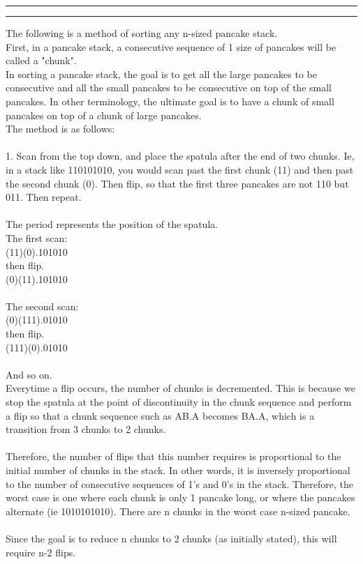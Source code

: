 \documentclass[11pt]{article}
\newcounter{questionCounter}
\newcounter{partCounter}[questionCounter]
\newenvironment{question}[2][\arabic{questionCounter}]{%
    \setcounter{partCounter}{0}%
    \vspace{.25in} \hrule \vspace{0.5em}%
        \noindent{\bf #2}%
    \vspace{0.8em} \hrule \vspace{.10in}%
    \addtocounter{questionCounter}{1}%
}{}
\begin{document}
\begin{question}{Post Puzzle Pancake Party}
The following is a method of sorting any n-sized pancake stack.\\
First, in a pancake stack, a consecutive sequence of 1 size of pancakes will be called a "chunk".\\
In sorting a pancake stack, the goal is to get all the large pancakes to be consecutive and all the small pancakes to be consecutive on top of the small pancakes. In other terminology, the ultimate goal is to have a chunk of small pancakes on top of a chunk of large pancakes.\\
The method is as follows:\\
\\
1. Scan from the top down, and place the spatula after the end of two chunks. Ie, in a stack like 110101010, you would scan past the first chunk (11) and then past the second chunk (0). Then flip, so that the first three pancakes are not 110 but 011. Then repeat.\\
\\
The period represents the position of the spatula. \\
The first scan:\\
(11)(0).101010\\
then flip.\\
(0)(11).101010\\
\\
The second scan:\\
(0)(111).01010\\
then flip. \\
(111)(0).01010\\
\\
And so on.
\\
Everytime a flip occurs, the number of chunks is decremented. This is because we stop the spatula at the point of discontinuity in the chunk sequence and perform a flip so that a chunk sequence such as AB.A becomes BA.A, which is a transition from 3 chunks to 2 chunks.\\
\\
Therefore, the number of flips that this number requires is proportional to the initial number of chunks in the stack. In other words, it is inversely proportional to the number of consecutive sequences of 1's and 0's in the stack. Therefore, the worst case is one where each chunk is only 1 pancake long, or where the pancakes alternate (ie 1010101010). There are n chunks in the worst case n-sized pancake.\\
\\
Since the goal is to reduce n chunks to 2 chunks (as initially stated), this will require n-2 flips.

\end{question}
\end{document}
